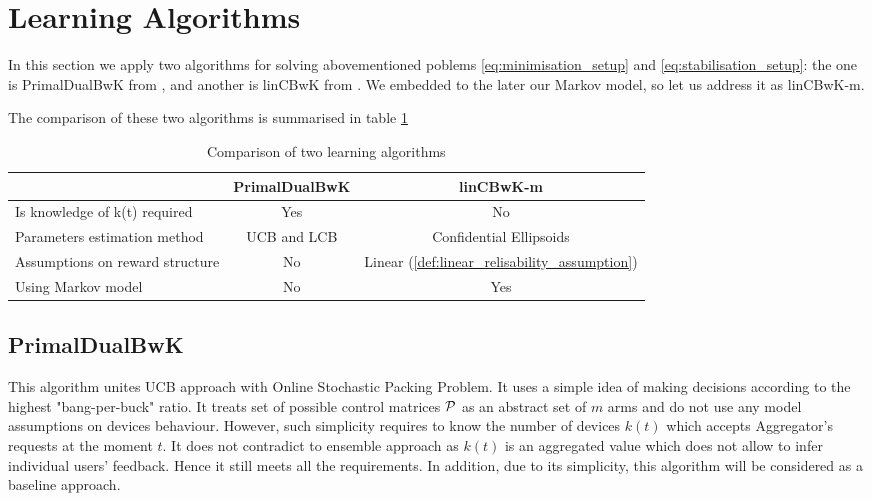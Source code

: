 \section{Learning Algorithms}
\label{sec:algorithms}

In this section we apply two algorithms for solving abovementioned poblems \ref{eq:minimisation_setup} and \ref{eq:stabilisation_setup}: the one is PrimalDualBwK from \cite{Badanidiyuru2013}, and another is linCBwK from \cite{Agrawal2015}. We embedded to the later our Markov model, so let us address it as linCBwK-m.

The comparison of these two algorithms is summarised in table \ref{table:algorithms_comparison}

\begin{table}[h!]
    \centering
    \label{table:algorithms_comparison}
    \begin{tabular}{|l|c|c|}
        \hline
         & PrimalDualBwK & linCBwK-m \\
         \hline \hline 
         Is knowledge of k(t) required & Yes & No \\
         \hline 
         Parameters estimation method & UCB and LCB & Confidential Ellipsoids \\
         \hline
         Assumptions on reward structure & No & Linear (\ref{def:linear_relisability_assumption}) \\
         \hline 
         Using Markov model & No & Yes \\
         \hline
    \end{tabular}
    \caption{Comparison of two learning algorithms}
\end{table}

\subsection{PrimalDualBwK}

This algorithm unites UCB approach with Online Stochastic Packing Problem. It uses a simple idea of making decisions according to the highest "bang-per-buck" ratio. It treats set of possible control matrices $\operatorname{\mathcal{P}}$ as an abstract set of $m$ arms and do not use any model assumptions on devices behaviour. However, such simplicity requires to know the number of devices $k(t)$ which accepts Aggregator's requests at the moment $t$. It does not contradict to ensemble approach as $k(t)$ is an aggregated value which does not allow to infer individual users' feedback. Hence it still meets all the requirements. In addition, due to its simplicity, this algorithm will be considered as a baseline approach.

